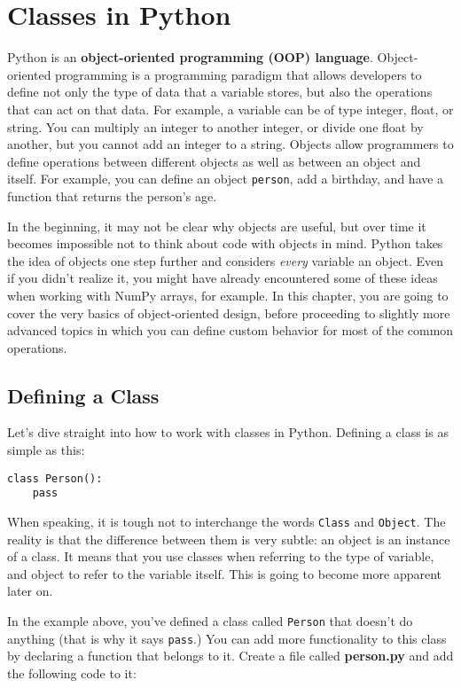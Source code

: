 \chapter{Classes in Python}\label{ch:classes-in-python}
Python is an \textbf{object-oriented programming (OOP) language}. Object-oriented programming is a programming paradigm that allows developers to define not only the type of data that a variable stores, but also the operations that can act on that data. For example, a variable can be of type integer, float, or string. You can multiply an integer to another integer, or divide one float by another, but you cannot add an integer to a string. Objects allow programmers to define operations between different objects as well as between an object and itself. For example, you can define an object \texttt{person}, add a birthday, and have a function that returns the person's age.

In the beginning, it may not be clear why objects are useful, but over time it becomes impossible not to think about code with objects in mind. Python takes the idea of objects one step further and considers \textit{every} variable an object. Even if you didn't realize it, you might have already encountered some of these ideas when working with NumPy arrays, for example. In this chapter, you are going to cover the very basics of object-oriented design, before proceeding to slightly more advanced topics in which you can define custom behavior for most of the common operations.

\section{Defining a Class}\label{sec:defining-a-class}
Let's dive straight into how to work with classes in Python. Defining a class is as simple as this:

\begin{verbatim}
class Person():
    pass
\end{verbatim}

When speaking, it is tough not to interchange the words \texttt{Class} and \texttt{Object}. The reality is that the difference between them is very subtle: an object is an instance of a class. It means that you use classes when referring to the type of variable, and object to refer to the variable itself. This is going to become more apparent later on.

In the example above, you've defined a class called \texttt{Person} that doesn't do anything (that is why it says \texttt{pass}.) You can add more functionality to this class by declaring a function that belongs to it. Create a file called \textbf{person.py} and add the following code to it:

